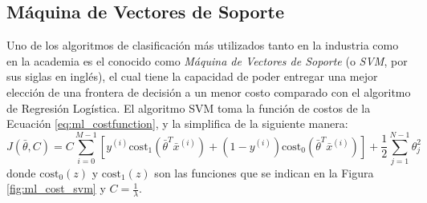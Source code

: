 \subsection{Máquina de Vectores de Soporte}\label{subc:ml_svm}
Uno de los algoritmos de clasificación más utilizados tanto en la industria como en la academia es el conocido como \emph{Máquina de Vectores de Soporte} (o \emph{SVM}, por sus siglas en inglés), el cual tiene la capacidad de poder entregar una mejor elección de una frontera de decisión a un menor costo comparado con el algoritmo de Regresión Logística. El algoritmo SVM toma la función de costos de la Ecuación \ref{eq:ml_costfunction}, y la simplifica de la siguiente manera:
\begin{equation}
  J(\bar{\theta},C)= C\sum_{i=0}^{M-1} \left[y^{(i)} \mathrm{cost}_1 (\bar{\theta}^T \bar{x}^{(i)}) + (1-y^{(i)}) \mathrm{cost}_0 (\bar{\theta}^T \bar{x}^{(i)}) \right]+\frac{1}{2}\sum_{j=1}^{N-1}\theta_j^2
  \label{eq:ml_costfunction_svm}
\end{equation}
donde $\mathrm{cost}_0(z)$ y $\mathrm{cost}_1(z)$ son las funciones que se indican en la Figura \ref{fig:ml_cost_svm} y $C = \frac{1}{\lambda}$.
